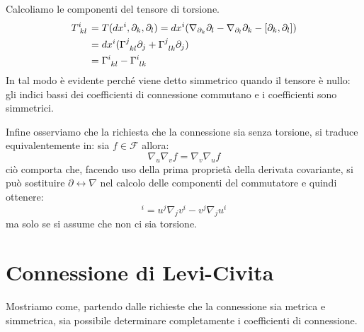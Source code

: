 Calcoliamo le componenti del tensore di torsione.
\begin{align*}
    \tensor{T}{^i_{kl}} &= T( dx^i, \partial_k, \partial_l ) = dx^i ( \nabla_{\partial_k}\partial_l - \nabla_{\partial_l}\partial_k - [\partial_k, \partial_l] ) \\
    &=dx^i( \tensor{\Gamma}{^j_{kl}}\partial_j + \tensor{\Gamma}{^j_{lk}}\partial_j ) \\
    &= \tensor{\Gamma}{^i_{kl}} - \tensor{\Gamma}{^i_{lk}}
\end{align*}
In tal modo è evidente perché viene detto simmetrico quando il tensore è nullo: gli indici bassi dei coefficienti di connessione commutano e i coefficienti sono simmetrici.

Infine osserviamo che la richiesta che la connessione sia senza torsione, si traduce equivalentemente in: sia $f \in \mathcal{F}$ allora:
\begin{equation*}
    \nabla_u \nabla_ v f = \nabla_v \nabla_u f
\end{equation*}
ciò comporta che, facendo uso della prima proprietà della derivata covariante, si può sostituire $\partial \leftrightarrow \nabla$ nel calcolo delle componenti del commutatore e quindi ottenere:
\begin{equation}
    [u,v]^i = u^j\nabla_j v^i - v^j\nabla_ju^i
    \label{eq.commutnabla}
\end{equation}
ma solo se si assume che non ci sia torsione.
\section{Connessione di Levi-Civita}
Mostriamo come, partendo dalle richieste che la connessione sia metrica e simmetrica, sia possibile determinare completamente i coefficienti di connessione.

